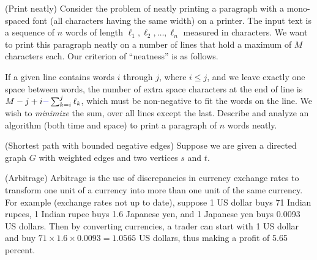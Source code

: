 \newpage
\begin{questions}

  \question[15] (Print neatly) Consider the problem of neatly printing
  a paragraph with a mono-spaced font (all characters having the same
  width) on a printer. The input text is a sequence of $n$ words of
  length $\ell_1,\ell_2,\ldots,\ell_n$ measured in characters. We want
  to print this paragraph neatly on a number of lines that hold a
  maximum of $M$ characters each. Our criterion of ``neatness'' is as
  follows.

  If a given line contains words $i$ through $j$, where $i\le j$, and
  we leave exactly one space between words, the number of extra space
  characters at the end of line is $M - j +i {\color{blue}{-}} \sum_{k=i}^j \ell_k$,
  which must be non-negative to fit the words on the line. We wish to
  \emph{minimize} the sum, over all lines except the last. Describe
  and analyze an algorithm (both time and space) to print a paragraph
  of $n$ words neatly. 

  \newpage
  \question (Shortest path with bounded negative edges) Suppose we
  are given a directed graph $G$ with weighted edges and two vertices
  $s$ and $t$.
\newpage
\question (Arbitrage) Arbitrage is the use of discrepancies in
currency exchange rates to transform one unit of a currency into more
than one unit of the same currency. For example (exchange rates not
up to date), suppose 1 US dollar buys 71 Indian rupees, 1 Indian rupee
buys 1.6 Japanese yen, and 1 Japanese yen buys 0.0093 US dollars. Then
by converting currencies, a trader can start with 1 US dollar and buy
$71\times 1.6 \times 0.0093 = 1.0565$ US dollars, thus making a profit
of 5.65 percent.


\end{questions}
